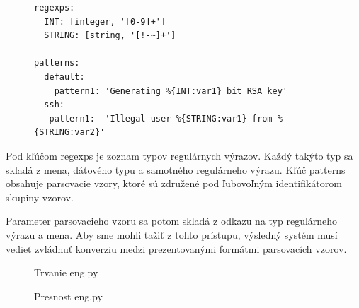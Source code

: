 \begin{figure}[h]
\centering
\begin{minipage}{0.9\textwidth}
\lstset{tabsize=4,columns=flexible,breaklines=true,breakatwhitespace=true, showstringspaces=false}
\begin{lstlisting}
regexps:
  INT: [integer, '[0-9]+']
  STRING: [string, '[!-~]+']
  
patterns:
  default:
    pattern1: 'Generating %{INT:var1} bit RSA key'
  ssh:
   pattern1:  'Illegal user %{STRING:var1} from %{STRING:var2}'
\end{lstlisting} 		
\end{minipage} 
\end{figure}

Pod kľúčom regexps je zoznam typov regulárnych výrazov. Každý takýto typ sa skladá z mena, dátového typu a samotného regulárneho výrazu. Kľúč patterns obsahuje parsovacie vzory, ktoré sú združené pod ľubovoľným identifikátorom skupiny vzorov. 
\par Parameter parsovacieho vzoru sa potom skladá z odkazu na typ regulárneho výrazu a mena. Aby sme mohli ťažiť z tohto prístupu, výsledný systém musí vedieť zvládnuť konverziu medzi prezentovanými formátmi parsovacích vzorov.


\begin{figure}[htbp]
 \centering 
 \begin{minipage}{0.95\linewidth}
 	\centering
 \end{minipage}
  \caption{Trvanie eng.py }
  \label{fig:eng-duration}
\end{figure}

\begin{figure}[htbp]
 \centering 
 \begin{minipage}{0.95\linewidth}
 	\centering
 \end{minipage}
  \caption{Presnost eng.py }
  \label{fig:eng-precision}
\end{figure}
